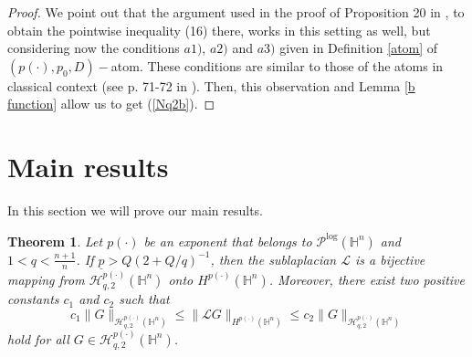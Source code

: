 \documentclass[oneside,10pt]{article}
\newtheorem{theorem}{Theorem}
\begin{document}
\begin{proof} We point out that the argument used in the proof of Proposition 20 in \cite{rocha5}, to obtain the pointwise inequality
(16) there, works in this setting as well, but considering now the conditions $a1)$, $a2)$ and $a3)$ given in Definition 
\ref{atom} of $(p(\cdot), p_0, D)-$atom. These conditions are similar to those of the atoms in classical context (see p. 71-72 
in \cite{Foll-St}). Then, this observation and Lemma \ref{b function} allow us to get (\ref{Nq2b}).
\end{proof}



\section{Main results}

In this section we will prove our main results.

\begin{theorem} \label{main thm} 
Let $p(\cdot)$ be an exponent that belongs to $\mathcal{P}^{\log}(\mathbb{H}^{n})$ and $1 < q < \frac{n+1}{n}$. 
If $\underline{p} > Q (2 + Q/q)^{-1}$, then the sublaplacian $\mathcal{L}$ is a bijective mapping from 
$\mathcal{H}^{p(\cdot)}_{q, 2}(\mathbb{H}^{n})$ onto $H^{p(\cdot)}(\mathbb{H}^{n})$. Moreover, there exist two positive constants 
$c_1$ and $c_2$ such that
\[
c_1 \|G \|_{\mathcal{H}^{p(\cdot)}_{q, 2}(\mathbb{H}^{n})} \leq \| \mathcal{L}G \|_{H^{p(\cdot)}(\mathbb{H}^{n})} \leq 
c_2 \|G \|_{\mathcal{H}^{p(\cdot)}_{q, 2}(\mathbb{H}^{n})}
\]
hold for all $G \in \mathcal{H}^{p(\cdot)}_{q, 2}(\mathbb{H}^{n})$.
\end{theorem}
\end{document}
